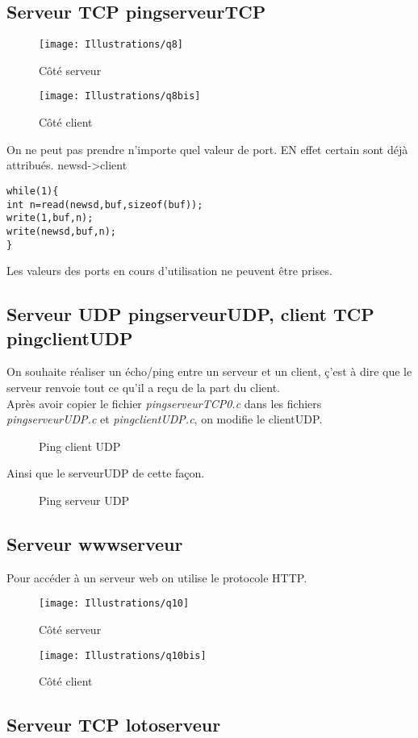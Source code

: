 \documentclass[paper=a4, fontsize=12pt]{article}
\numberwithin{equation}{section}		%
\numberwithin{figure}{section}			%
\numberwithin{table}{section}				%
\begin{document}
\subsection{Serveur TCP pingserveurTCP}
\begin{figure}[h!]
\centerline{\texttt{[image: Illustrations/q8]}}
\caption{\label{Illustrations/q8} Côté serveur}
\end{figure}
\begin{figure}[h!]
\centerline{\texttt{[image: Illustrations/q8bis]}}
\caption{\label{Illustrations/q8bis} Côté client}
\end{figure}
On ne peut pas prendre n'importe quel valeur de port. EN effet certain sont déjà attribués.
newsd->client
\begin{verbatim}
while(1){
int n=read(newsd,buf,sizeof(buf));
write(1,buf,n);
write(newsd,buf,n);
}
\end{verbatim}
Les valeurs des ports en cours d'utilisation ne peuvent être prises.
\subsection{Serveur UDP pingserveurUDP, client TCP pingclientUDP}
On souhaite réaliser un écho/ping entre un serveur et un client, ç'est à dire que le serveur renvoie tout ce qu'il a reçu de la part du client. 
\\Après avoir copier le fichier \textit{pingserveurTCP0.c} dans les fichiers  \textit{pingserveurUDP.c} et  \textit{pingclientUDP.c}, on modifie le clientUDP.

\begin{figure}[h!]
\caption{\label{Illustrations/decoupage_etapes_2}Ping client UDP}
\end{figure}
Ainsi que le serveurUDP de cette façon.
\begin{figure}[h!]
\caption{\label{Illustrations/decoupage_etapes_2}Ping serveur UDP}
\end{figure}

\subsection{Serveur wwwserveur}
Pour accéder à un serveur web on utilise le protocole HTTP.
\begin{figure}[h!]
\centerline{\texttt{[image: Illustrations/q10]}}
\caption{\label{Illustrations/q10} Côté serveur}
\end{figure}
\begin{figure}[h!]
\centerline{\texttt{[image: Illustrations/q10bis]}}
\caption{\label{Illustrations/q10bis} Côté client}
\end{figure}
\subsection{Serveur TCP lotoserveur}

\end{document}
